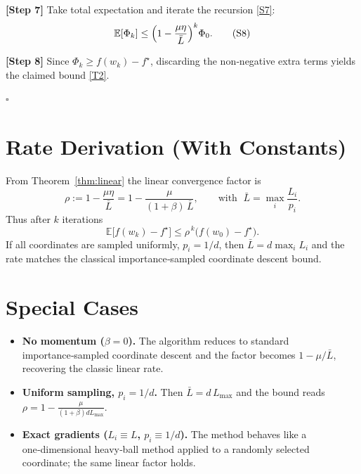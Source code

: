 \documentclass{article}
\newcommand{\E}{\mathbb{E}}
\begin{document}
\noindent\textbf{[Step 7]} Take total expectation and iterate the recursion
\eqref{S7}:
\[
\E[\Phi_k]\le\Bigl(1-\frac{\mu\eta}{\bar L}\Bigr)^{k}\Phi_0.
\tag{S8}
\]

\noindent\textbf{[Step 8]} Since $\Phi_k\ge f(w_k)-f^\star$, discarding the
non‑negative extra terms yields the claimed bound \eqref{T2}.

\hfill $\square$

\section*{Rate Derivation (With Constants)}
From Theorem~\ref{thm:linear} the linear convergence factor is
\[
\rho:=1-\frac{\mu\eta}{\bar L}
      =1-\frac{\mu}{(1+\beta)\,\bar L},
\qquad\text{with }\;\bar L=\max_i\frac{L_i}{p_i}.
\]
Thus after $k$ iterations
\[
\E\!\bigl[f(w_k)-f^\star\bigr]\le \rho^{\,k}
\bigl(f(w_0)-f^\star\bigr).
\]
If all coordinates are sampled uniformly, $p_i=1/d$, then
$\bar L= d\max_i L_i$ and the rate matches the classical
importance‑sampled coordinate descent bound.

\section*{Special Cases}
\begin{itemize}
\item \textbf{No momentum ($\beta=0$).}
The algorithm reduces to standard importance‑sampled coordinate descent
and the factor becomes $1-\mu/\bar L$, recovering the classic linear rate.
\item \textbf{Uniform sampling, $p_i=1/d$.}
Then $\bar L = d\,L_{\max}$ and the bound reads
$\rho=1-\frac{\mu}{(1+\beta)dL_{\max}}$.
\item \textbf{Exact gradients ($L_i\equiv L$, $p_i\equiv1/d$).}
The method behaves like a one‑dimensional heavy‑ball method applied to a
randomly selected coordinate; the same linear factor holds.
\end{itemize}
\end{document}
